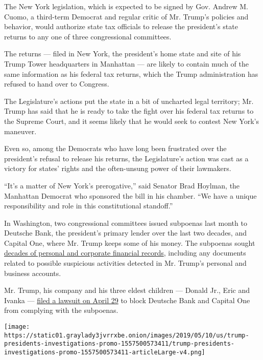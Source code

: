 The New York legislation, which is expected to be signed by Gov. Andrew
M. Cuomo, a third-term Democrat and regular critic of Mr. Trump's
policies and behavior, would authorize state tax officials to release
the president's state returns to any one of three congressional
committees.

The returns --- filed in New York, the president's home state and site
of his Trump Tower headquarters in Manhattan --- are likely to contain
much of the same information as his federal tax returns, which the Trump
administration has refused to hand over to Congress.

The Legislature's actions put the state in a bit of uncharted legal
territory; Mr. Trump has said that he is ready to take the fight over
his federal tax returns to the Supreme Court, and it seems likely that
he would seek to contest New York's maneuver.

Even so, among the Democrats who have long been frustrated over the
president's refusal to release his returns, the Legislature's action was
cast as a victory for states' rights and the often-unsung power of their
lawmakers.

``It's a matter of New York's prerogative,'' said Senator Brad Hoylman,
the Manhattan Democrat who sponsored the bill in his chamber. ``We have
a unique responsibility and role in this constitutional standoff.''

In Washington, two congressional committees issued subpoenas last month
to Deutsche Bank, the president's primary lender over the last two
decades, and Capital One, where Mr. Trump keeps some of his money. The
subpoenas sought
\href{https://www.nytimes3xbfgragh.onion/2019/04/30/business/deutsche-bank-donald-trump.html?module=inline}{decades
of personal and corporate financial records}, including any documents
related to possible suspicious activities detected in Mr. Trump's
personal and business accounts.

Mr. Trump, his company and his three eldest children --- Donald Jr.,
Eric and Ivanka ---
\href{https://www.nytimes3xbfgragh.onion/2019/04/29/us/politics/trump-lawsuit-deutsche-bank.html?module=inline}{filed
a lawsuit on April 29} to block Deutsche Bank and Capital One from
complying with the subpoenas.

\href{https://www.nytimes3xbfgragh.onion/interactive/2019/05/13/us/politics/trump-investigations.html}{}

\texttt{[image: https://static01.graylady3jvrrxbe.onion/images/2019/05/10/us/trump-presidents-investigations-promo-1557500573411/trump-presidents-investigations-promo-1557500573411-articleLarge-v4.png]}

